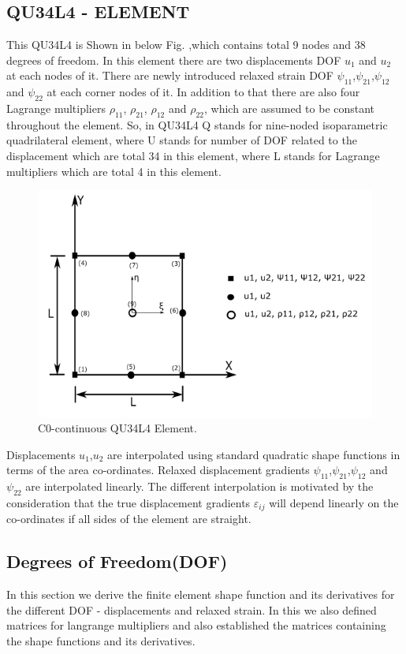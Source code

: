 \documentclass[12pt]{article}
\begin{document}
\subsection{QU34L4 - ELEMENT}
This QU34L4 is Shown in below Fig. ,which contains total 9 nodes and 38 degrees of freedom. In this element there are two displacements DOF $ u_1 $ and $ u_2  $ at each nodes of it. There are newly introduced relaxed strain DOF $ \psi_{11} $,$ \psi_{21} $,$ \psi_{12} $ and $ \psi_{22} $ at each corner nodes of it. In addition to that there are also four Lagrange multipliers $ \rho_{11} $,  $ \rho_{21} $, $ \rho_{12} $ and $ \rho_{22} $,  which are assumed to be constant throughout the element. So, in QU34L4 Q stands for nine-noded isoparametric quadrilateral element, where U stands for number of DOF related to the displacement which are total 34 in this element, where L stands for Lagrange multipliers which are total 4 in this element. 
\begin{figure}[H]
	\begin{center}
		\includegraphics[scale=0.8]{ele_1.png}
	\end{center} 
    \caption{C0-continuous QU34L4 Element.} 
\end{figure}
Displacements $ u_1 $,$ u_2 $ are interpolated using standard quadratic shape functions in terms of the area co-ordinates. Relaxed displacement gradients $ \psi_{11} $,$ \psi_{21} $,$ \psi_{12} $ and $ \psi_{22} $ are interpolated linearly. The different interpolation is motivated by the consideration that the true displacement gradients $ \varepsilon_{ij} $ will depend linearly
on the co-ordinates if all sides of the element are straight.
\subsection{Degrees of Freedom(DOF)}
In this section we derive the finite element shape function and its derivatives for the different DOF - displacements and relaxed strain. In this we also defined matrices for langrange multipliers and also established the matrices containing the shape functions and its derivatives.
\end{document}
